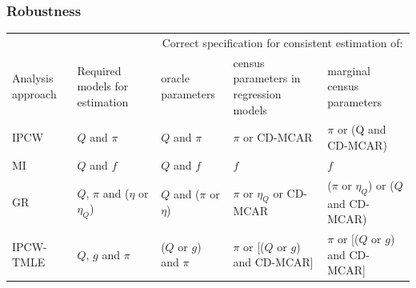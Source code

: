 \documentclass[10pt, table]{beamer}
\begin{document}
\begin{frame} \frametitle{Robustness}

\begin{table}
  \vspace{-0.3cm}  
  \begin{threeparttable}
    \begin{tabular}{p{0.55in}|p{0.55in}p{0.8in}p{0.8in}p{0.8in}}
         & & \multicolumn{3}{c}{Correct specification for consistent estimation of:} \\
       Analysis approach  & Required models for estimation & oracle parameters & census parameters in regression models & marginal census parameters\\
       \hline
        IPCW & $Q$ and $\pi$ & $Q$ and $\pi$ & $\pi$ or CD-MCAR & $\pi$ or (Q and  CD-MCAR)\\
        MI & $Q$ and $f$ & $Q$ and $f$ & $f$ & $f$ \\
        GR & $Q$, $\pi$ and ($\eta$ or $\eta_Q$)  & $Q$ and ($\pi$ or $\eta$) & $\pi$ or $\eta_Q$ or CD-MCAR & ($\pi$ or $\eta_Q$) or ($Q$ and CD-MCAR)\\
        IPCW-TMLE & $Q$, $g$ and $\pi$ & ($Q$ or $g$) and $\pi$ & $\pi$ or [($Q$ or $g$) and CD-MCAR] & $\pi$ or [($Q$ or $g$) and CD-MCAR] \\ \hline
    \end{tabular}
    \label{tab:required_models}
    \end{threeparttable} 
    \fontsize{8pt}{7.2}
\end{table}

\end{frame}
\end{document}
